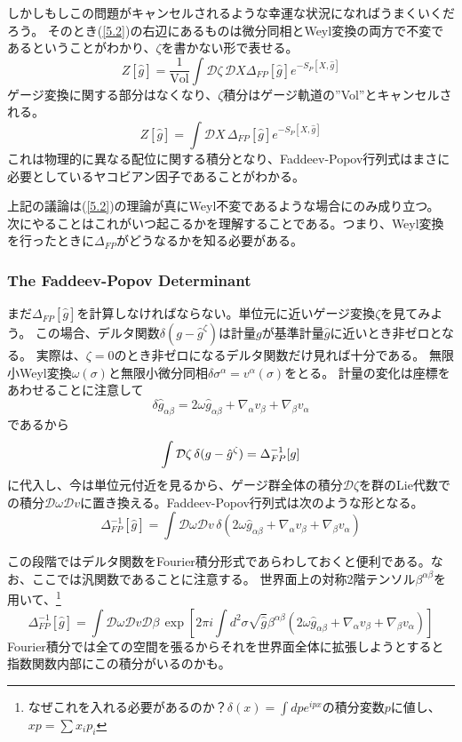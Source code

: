 \documentclass[10pt]{jsarticle}
\newcommand{\kkakko}[1]{\left[ #1 \right]} %
\newcommand{\sint}[1]{\int\mathcal{D}#1\,}%
\begin{document}
しかしもしこの問題がキャンセルされるような幸運な状況になればうまくいくだろう。
そのとき(\ref{5.2})の右辺にあるものは微分同相とWeyl変換の両方で不変であるということがわかり、$\zeta$を書かない形で表せる。
\begin{equation}
  Z[\hat{g}]=\frac{1}{\mathrm{Vol}}\sint{\zeta}\mathcal{D}X\Delta_{FP}[\hat{g}]e^{-S_{P}[X,\hat{g}]}
\end{equation}
ゲージ変換に関する部分はなくなり、$\zeta$積分はゲージ軌道の''Vol''とキャンセルされる。
\begin{equation}
 \label{5.3} Z[\hat{g}]=\sint{X}\Delta_{FP}[\hat{g}]e^{-S_{P}[X,\hat{g}]}
\end{equation}
これは物理的に異なる配位に関する積分となり、Faddeev-Popov行列式はまさに必要としているヤコビアン因子であることがわかる。

上記の議論は(\ref{5.2})の理論が真にWeyl不変であるような場合にのみ成り立つ。
次にやることはこれがいつ起こるかを理解することである。つまり、Weyl変換を行ったときに$\Delta_{FP}$がどうなるかを知る必要がある。
\subsubsection{The Faddeev-Popov Determinant}
まだ$\Delta_{FP}[\hat{g}]$を計算しなければならない。単位元に近いゲージ変換$\zeta$を見てみよう。
この場合、デルタ関数$\delta(g-\hat{g}^{\zeta})$は計量$g$が基準計量$\hat{g}$に近いとき非ゼロとなる。
実際は、$\zeta=0$のとき非ゼロになるデルタ関数だけ見れば十分である。
無限小Weyl変換$\omega(\sigma)$と無限小微分同相$\delta \sigma^{\alpha}=v^{\alpha}(\sigma)$をとる。
計量の変化は座標をあわせることに注意して
\begin{equation}
  \delta \hat{g}_{\alpha\beta}=2\omega \hat{g}_{\alpha\beta} +\nabla_{\alpha}v_{\beta}+\nabla_{\beta}v_{\alpha}
\end{equation}
であるから
\begin{equation}
  \int \mathcal{D}\zeta \,\delta(g-\hat{g}^{\zeta})=\Delta^{-1}_{FP}[g] \notag
\end{equation}
に代入し、今は単位元付近を見るから、ゲージ群全体の積分$\mathcal{D}\zeta$を群のLie代数での積分$\mathcal{D}\omega\mathcal{D}v$に置き換える。Faddeev-Popov行列式は次のような形となる。
\begin{equation}
 \label{5.4} \Delta^{-1}_{FP}[\hat{g}]=\int\mathcal{D}\omega\mathcal{D}v\,\delta(2\omega \hat{g}_{\alpha\beta} +\nabla_{\alpha}v_{\beta}+\nabla_{\beta}v_{\alpha})
\end{equation}


この段階ではデルタ関数をFourier積分形式であらわしておくと便利である。なお、ここでは汎関数であることに注意する。
世界面上の対称2階テンソル$\beta^{\alpha\beta}$を用いて、\footnote{なぜこれを入れる必要があるのか？$\delta(x)=\int dp e^{ipx}$の積分変数$p$に値し、$xp=\sum x_{i}p_{i}$}
\begin{equation}
\Delta^{-1}_{FP}[\hat{g}]=\int\mathcal{D}\omega\mathcal{D}v\mathcal{D}\beta \,\exp \kkakko{2\pi i\int d^{2}\sigma \sqrt{\hat{g}}\beta^{\alpha\beta} (2\omega \hat{g}_{\alpha\beta} +\nabla_{\alpha}v_{\beta}+\nabla_{\beta}v_{\alpha})}
 \end{equation}
Fourier積分では全ての空間を張るからそれを世界面全体に拡張しようとすると指数関数内部にこの積分がいるのかも。
\end{document}
